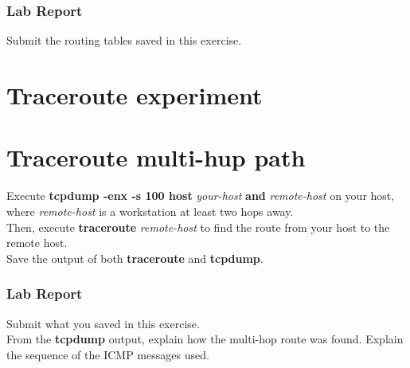 \documentclass{../UTNetLab}
\begin{document}
    \subsubsection*{Lab Report}
    Submit the routing tables saved in this exercise.


\section*{Traceroute experiment}
\section{Traceroute multi-hup path}
    Execute \textbf{tcpdump -enx -s 100 host} \textit{your-host} \textbf{and} \textit{remote-host} on your host, where \textit{remote-host} is a workstation at least two hops away. \\
    Then, execute \textbf{traceroute} \textit{remote-host} to find the route from your host to the remote host. \\
    Save the output of both \textbf{traceroute} and \textbf{tcpdump}.

    \subsubsection*{Lab Report}
    Submit what you saved in this exercise. \\
    From the \textbf{tcpdump} output, explain how the multi-hop route was found.
    Explain the sequence of the ICMP messages used.
\end{document}
